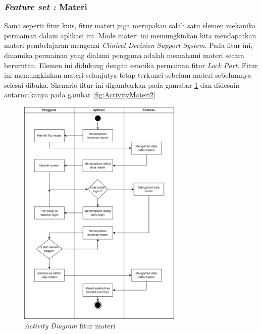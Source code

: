 \subsubsection{\textit{Feature set :} Materi}

Sama seperti fitur kuis, fitur materi juga merupakan salah satu elemen mekanika permainan dalam aplikasi ini.
Mode materi ini memungkinkan kita mendapatkan materi pembelajaran mengenai \textit{Clinical Decision Support System}.
Pada fitur ini, dinamika permainan yang dialami pengguna adalah memahami materi secara berurutan. Elemen ini didukung dengan estetika permainan fitur \textit{Lock Part}.
Fitur ini memungkinkan materi selanjutya tetap terkunci sebelum materi sebelumnya selesai dibuka. Skenario fitur ini digambarkan pada gamabar \ref*{Fig:ActivityMateri} dan didesain antarmukanya pada gambar \ref*{fig:ActivityMateri2}
\begin{figure}[H]
	\centering
	\includegraphics[width=0.7\textwidth]{contents/chapter-3/images/AD-materi.png}
	\caption{\textit{Activity Diagram} fitur materi }
	\label{Fig:ActivityMateri}
\end{figure}

